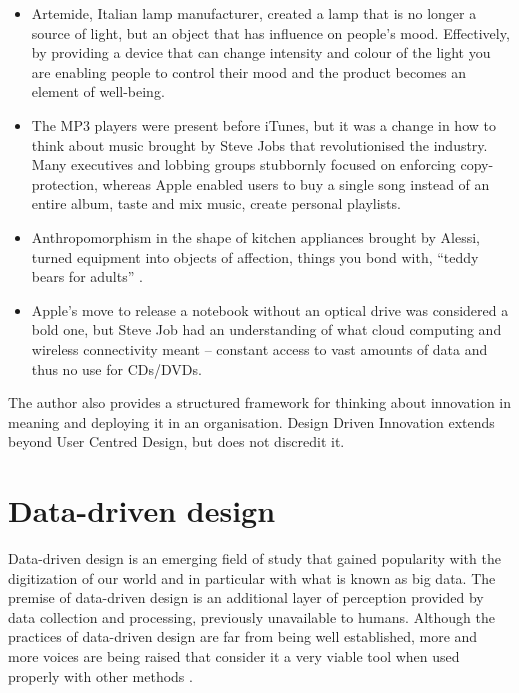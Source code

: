 \begin{itemize}
\item Artemide, Italian lamp manufacturer, created a lamp that is no longer a source of light, but an object that has influence on people’s mood. Effectively, by providing a device that can change intensity and colour of the light you are enabling people to control their mood and the product becomes an element of well-being.

\item The MP3 players were present before iTunes, but it was a change in how to think about music brought by Steve Jobs that revolutionised the industry. Many executives and lobbing groups stubbornly focused on enforcing copy-protection, whereas Apple enabled users to buy a single song instead of an entire album, taste and mix music, create personal playlists.

\item Anthropomorphism in the shape of kitchen appliances brought by Alessi, turned equipment into objects of affection, things you bond with, “teddy bears for adults” \citep{verganti2013design}.

\item Apple’s move to release a notebook without an optical drive was considered a bold one, but Steve Job had an understanding of what cloud computing and wireless connectivity meant – constant access to vast amounts of data and thus no use for CDs/DVDs.
\end{itemize}

The author also provides a structured framework for thinking about innovation in meaning and deploying it in an organisation. Design Driven Innovation extends beyond User Centred Design, but does not discredit it.

	\section{Data-driven design}
	
Data-driven design is an emerging field of study that gained popularity with the digitization of our world and in particular with what is known as big data. The premise of data-driven design is an additional layer of perception provided by data collection and processing, previously unavailable to humans. Although the practices of data-driven design are far from being well established, more and more voices are being raised that consider it a very viable tool when used properly with other methods \citep{Neirotti2014}.
	
